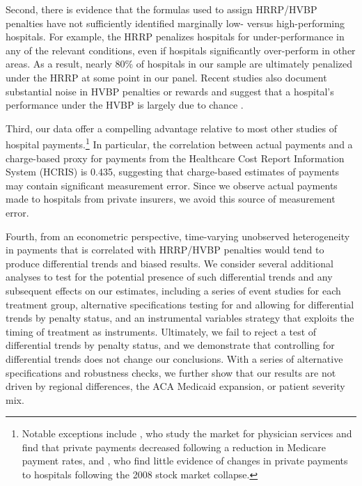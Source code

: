 \documentclass[12pt]{article}
\begin{document}
Second, there is evidence that the formulas used to assign HRRP/HVBP penalties have not sufficiently identified marginally low- versus high-performing hospitals. For example, the HRRP penalizes hospitals for under-performance in any of the relevant conditions, even if hospitals significantly over-perform in other areas. As a result, nearly 80\% of hospitals in our sample are ultimately penalized under the HRRP at some point in our panel. Recent studies also document substantial noise in HVBP penalties or rewards and suggest that a hospital's performance under the HVBP is largely due to chance \citep{friedson2016,wilcock2018}.

Third, our data offer a compelling advantage relative to most other studies of hospital payments.\footnote{Notable exceptions include \cite{clemens2017}, who study the market for physician services and find that private payments decreased following a reduction in Medicare payment rates, and \cite{dranove2017}, who find little evidence of changes in private payments to hospitals following the 2008 stock market collapse.} In particular, the correlation between actual payments and a charge-based proxy for payments from the Healthcare Cost Report Information System (HCRIS) is 0.435, suggesting that charge-based estimates of payments may contain significant measurement error. Since we observe actual payments made to hospitals from private insurers, we avoid this source of measurement error.

Fourth, from an econometric perspective, time-varying unobserved heterogeneity in payments that is correlated with HRRP/HVBP penalties would tend to produce differential trends and biased results. We consider several additional analyses to test for the potential presence of such differential trends and any subsequent effects on our estimates, including a series of event studies for each treatment group, alternative specifications testing for and allowing for differential trends by penalty status, and an instrumental variables strategy that exploits the timing of treatment as instruments. Ultimately, we fail to reject a test of differential trends by penalty status, and we demonstrate that controlling for differential trends does not change our conclusions. With a series of alternative specifications and robustness checks, we further show that our results are not driven by regional differences, the ACA Medicaid expansion, or patient severity mix.
\end{document}
